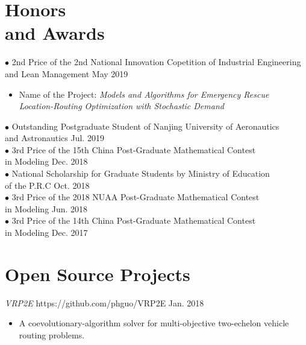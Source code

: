 \documentclass[margin]{res}
\begin{document}
\begin{resume}
\section{\sc Honors \\and Awards}
$\bullet$ 2nd Price of the 2nd National Innovation Copetition of Industrial Engineering\\ and Lean Management \hfill May 2019 
\begin{itemize}  \itemsep -2pt  %
\item Name of the Project: \textit{Models and Algorithms for Emergency Rescue \\Location-Routing Optimization with Stochastic Demand}
\end{itemize} \vspace{-1em}
$\bullet$ Outstanding Postgraduate Student of Nanjing University of Aeronautics \\and Astronautics \hfill Jul. 2019\\
$\bullet$ 3rd Price of the 15th China Post-Graduate Mathematical Contest \\in Modeling \hfill Dec. 2018\\
$\bullet$ National Scholarship for Graduate Students by Ministry of Education \\of the P.R.C \hfill Oct. 2018\\
$\bullet$ 3rd Price of the 2018 NUAA Post-Graduate Mathematical Contest \\in Modeling \hfill Jun. 2018\\
$\bullet$ 3rd Price of the 14th China Post-Graduate Mathematical Contest \\in Modeling \hfill Dec. 2017


\section{\sc Open Source Projects} 
\textit{VRP2E } https://github.com/phguo/VRP2E \hfill Jan. 2018
\begin{itemize} \itemsep -2pt
\item A coevolutionary-algorithm solver for multi-objective two-echelon vehicle routing problems.
\end{itemize}



\end{resume} 
\end{document}
